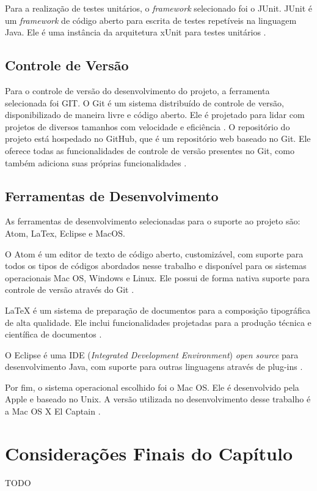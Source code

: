 Para a realização de testes unitários, o \textit{framework} selecionado foi o JUnit. JUnit é um \textit{framework} de código aberto para escrita de testes repetíveis na linguagem Java. Ele é uma instância da arquitetura xUnit para testes unitários \cite{junit2015}.

    \subsection{Controle de Versão}

Para o controle de versão do desenvolvimento do projeto, a ferramenta selecionada foi GIT. O Git é um sistema distribuído de controle de versão, disponibilizado de maneira livre e código aberto. Ele é projetado para lidar com projetos de diversos tamanhos com velocidade e eficiência \cite{git}. O repositório do projeto está hospedado no GitHub, que é um repositório web baseado no Git. Ele oferece todas as funcionalidades de controle de versão presentes no Git, como também adiciona suas próprias funcionalidades \cite{gitHub}.

    \subsection{Ferramentas de Desenvolvimento}

As ferramentas de desenvolvimento selecionadas para o suporte ao projeto são: Atom, LaTex, Eclipse e MacOS.

O Atom é um editor de texto de código aberto, customizável, com suporte para todos os tipos de códigos abordados nesse trabalho e disponível para os sistemas operacionais Mac OS, Windows e Linux. Ele possui de forma nativa suporte para controle de versão através do Git \cite{atom}.

LaTeX é um sistema de preparação de documentos para a composição tipográfica de alta qualidade. Ele inclui funcionalidades projetadas para a produção técnica e científica de documentos \cite{latex}.

O Eclipse é uma IDE (\textit{Integrated Development Environment}) \textit{open source} para
desenvolvimento Java, com suporte para outras linguagens através de plug-ins \cite{eclipse}.

Por fim, o sistema operacional escolhido foi o Mac OS. Ele é desenvolvido pela Apple e baseado no Unix. A versão utilizada no desenvolvimento desse trabalho é a Mac OS X El Captain \cite{macos}.

\section{Considerações Finais do Capítulo}

TODO
